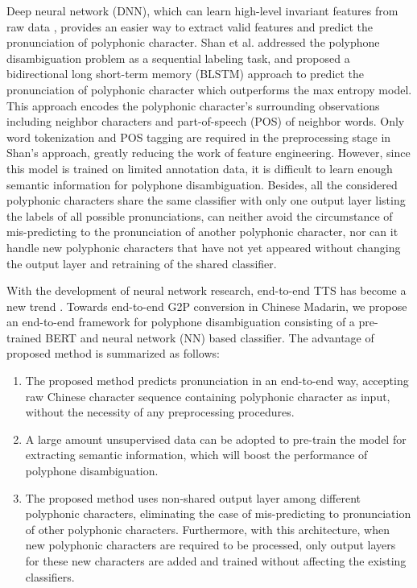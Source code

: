 \documentclass[a4paper]{article}
\begin{document}
Deep neural network (DNN), which can learn high-level invariant features from raw data \cite{bengio2013representation}, provides an easier way to extract valid features and predict the pronunciation of polyphonic character. Shan et al. \cite{shan2016bi} addressed the polyphone disambiguation problem as a sequential labeling task, and proposed a bidirectional long short-term memory (BLSTM) approach to predict the pronunciation of polyphonic character which outperforms the max entropy model. This approach encodes the polyphonic character’s surrounding observations including neighbor characters and part-of-speech (POS) of neighbor words. Only word tokenization and POS tagging are required in the preprocessing stage in Shan's approach, greatly reducing the work of feature engineering. However, since this model is trained on limited annotation data, it is difficult to learn enough semantic information for polyphone disambiguation. Besides, all the considered polyphonic characters share the same classifier with only one output layer listing the labels of all possible pronunciations, can neither avoid the circumstance of mis-predicting to the pronunciation of another polyphonic character, nor can it handle new polyphonic characters that have not yet appeared without changing the output layer and retraining of the shared classifier.

With the development of neural network research, end-to-end TTS has become a new trend \cite{sotelo2017char2wav, wang2017tacotron, li2018close}. Towards end-to-end G2P conversion in Chinese Madarin, we propose an end-to-end framework for polyphone disambiguation consisting of a pre-trained BERT \cite{devlin2018bert} and neural network (NN) based classifier. The advantage of proposed method is summarized as follows:
\begin{enumerate}
	\item The proposed method predicts pronunciation in an end-to-end way, accepting raw Chinese character sequence containing polyphonic character as input, without the necessity of any preprocessing procedures.
	\item A large amount unsupervised data can be adopted to pre-train the model for extracting semantic information, which will boost the performance of polyphone disambiguation.
	\item The proposed method uses non-shared output layer among different polyphonic characters, eliminating the case of mis-predicting to pronunciation of other polyphonic characters. Furthermore, with this architecture, when new polyphonic characters are required to be processed, only output layers for these new characters are added and trained without affecting the existing classifiers.
\end{enumerate}
\end{document}
